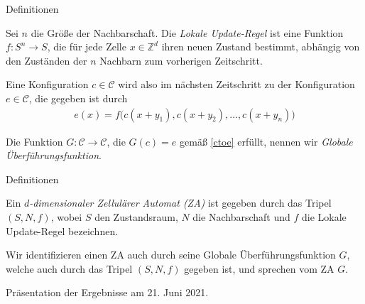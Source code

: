 \documentclass[aspectratio=169]{beamer}
\begin{document}
    \begin{frame}{Definitionen}
      \begin{definition*}
        Sei $n$ die Größe der Nachbarschaft. Die \textit{Lokale Update-Regel} ist eine Funktion $f: S^n \to S$, die für jede Zelle $x \in \mathbb{Z}^d$ ihren neuen Zustand bestimmt, abhängig von den Zuständen der $n$ Nachbarn zum vorherigen Zeitschritt.
      \end{definition*}

      Eine Konfiguration $c \in \mathcal{C}$ wird also im nächsten Zeitschritt zu der Konfiguration $e \in \mathcal{C}$, die gegeben ist durch
      \begin{align}\label{ctoe}
        e(x) = f \big(c(x+y_1), c(x+y_2), \dots, c(x+y_n)\big)
      \end{align}

          \begin{definition*}
            Die Funktion $G: \mathcal{C} \to \mathcal{C}$, die $G(c)=e$ gemäß \eqref{ctoe} erfüllt, nennen wir \textit{Globale Überführungsfunktion}.
          \end{definition*}

    \end{frame}



  \begin{frame}{Definitionen}
    \begin{definition*}
      Ein \textit{$d$-dimensionaler Zellulärer Automat (ZA)} ist gegeben durch das Tripel $(S,N,f)$, wobei $S$ den Zustandsraum, $N$ die Nachbarschaft und $f$ die Lokale Update-Regel bezeichnen.
    \end{definition*}

    \begin{remark*}
      Wir identifizieren einen ZA auch durch seine Globale Überführungsfunktion $G$, welche auch durch das Tripel $(S,N,f)$ gegeben ist, und sprechen vom ZA $G$.
    \end{remark*}

  \end{frame}



  \begin{frame}{}
    \begin{block}{}

      {
          \centering
          \huge
          Präsentation der Ergebnisse am 21. Juni 2021.
      }

    \end{block}

  \end{frame}
\end{document}
